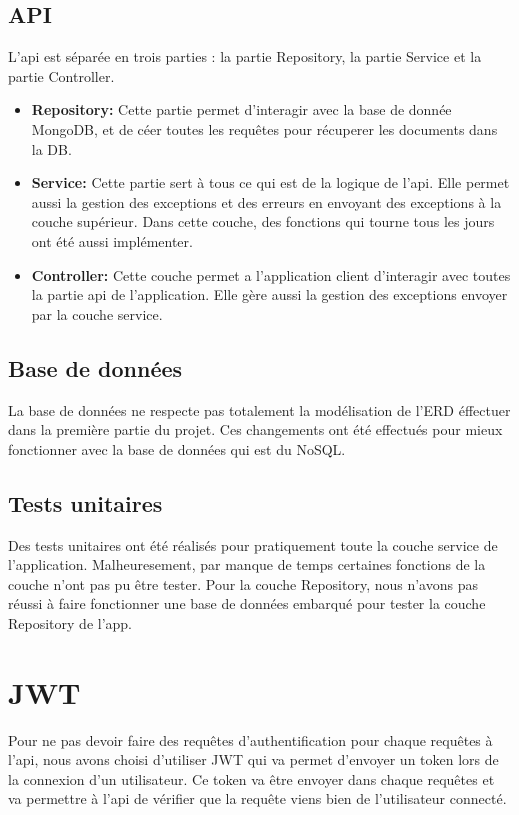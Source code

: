 \documentclass[../rapport.tex]{subfiles}
\begin{document}
\subsection{API}

L'api est séparée en trois parties : la partie Repository, la partie Service et la partie Controller.

\begin{itemize}
    \item \textbf{Repository:} Cette partie permet d'interagir avec la base de donnée MongoDB, et de céer toutes les requêtes pour récuperer les documents dans la DB.
    \item \textbf{Service:} Cette partie sert à tous ce qui est de la logique de l'api. Elle permet aussi la gestion des exceptions et des erreurs en envoyant des exceptions à la couche supérieur. Dans cette couche, des fonctions qui tourne tous les jours ont été aussi implémenter.
    \item \textbf{Controller:} Cette couche permet a l'application client d'interagir avec toutes la partie api de l'application. Elle gère aussi la gestion des exceptions envoyer par la couche service. 
\end{itemize}

\subsection{Base de données}

La base de données ne respecte pas totalement la modélisation de l'ERD éffectuer dans la première partie du projet.
Ces changements ont été effectués pour mieux fonctionner avec la base de données qui est du NoSQL.

\subsection{Tests unitaires}

Des tests unitaires ont été réalisés pour pratiquement toute la couche service de l'application. Malheuresement, par manque de temps certaines fonctions de la couche n'ont pas pu être tester. Pour la couche Repository, nous n'avons pas réussi à faire fonctionner une base de données embarqué pour tester la couche Repository de l'app.

\section{JWT}
 
Pour ne pas devoir faire des requêtes d'authentification pour chaque requêtes à l'api, nous avons choisi d'utiliser JWT qui va permet d'envoyer un token lors de la connexion d'un utilisateur. Ce token va être envoyer dans chaque requêtes et va permettre à l'api de vérifier que la requête viens bien de l'utilisateur connecté.
\end{document}

